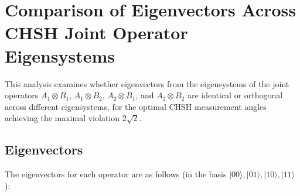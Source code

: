 \documentclass{article}
\begin{document}
\section*{Comparison of Eigenvectors Across CHSH Joint Operator Eigensystems}

This analysis examines whether eigenvectors from the eigensystems of the joint operators \( A_1 \otimes B_1 \), \( A_1 \otimes B_2 \), \( A_2 \otimes B_1 \), and \( A_2 \otimes B_2 \) are identical or orthogonal across different eigensystems, for the optimal CHSH measurement angles achieving the maximal violation \( 2\sqrt{2} \).

\subsection*{Eigenvectors}
The eigenvectors for each operator are as follows (in the basis \( |00\rangle, |01\rangle, |10\rangle, |11\rangle \)):
\end{document}

